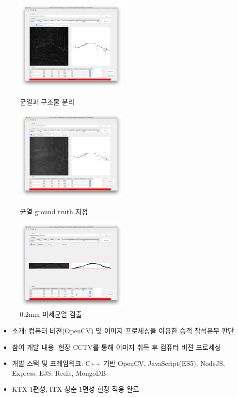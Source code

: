 \begin{figure}[ht]
	\begin{fullwidth}
		\parbox{0.5\textwidth}{
			\centering
			\includegraphics[width=0.5\textwidth]{images/zoomed_dog.png}
			\caption*{균열과 구조물 분리}
		}\qquad
		\parbox{0.5\textwidth}{
			\centering
			\includegraphics[width=0.5\textwidth]{images/zoomed.png}
			\caption*{균열 ground truth 지정}
		}\qquad
		\parbox{0.5\textwidth}{
			\centering
			\includegraphics[width=0.5\textwidth]{images/crack06.png}
			\caption*{0.2mm 미세균열 검출}
		}
	\end{fullwidth}
\end{figure}

\divider


\begin{itemize}
	\item 소개: 컴퓨터 비젼(OpenCV) 및 이미지 프로세싱을 이용한 승객 착석유무 판단
	\item 참여 개발 내용: 현장 CCTV를 통해 이미지 취득 후 컴퓨터 비젼 프로세싱
	\item 개발 스택 및 프레임워크: C++ 기반 OpenCV, JavaScript(ES5), NodeJS, Express, EJS, Redis, MongoDB
	\item KTX 1편성, ITX-청춘 1편성 현장 적용 완료
\end{itemize}

